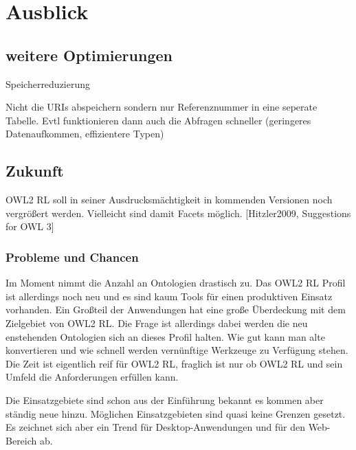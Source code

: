 \chapter{Ausblick}
\label{kapitel-ausblick}

\section{weitere Optimierungen}
Speicherreduzierung

Nicht die URIs abspeichern sondern nur Referenznummer in eine seperate Tabelle. Evtl funktionieren dann auch die Abfragen schneller (geringeres Datenaufkommen, effizientere Typen)

\section{Zukunft}
OWL2 RL soll in seiner Ausdrucksmächtigkeit in kommenden Versionen noch vergrößert werden. Vielleicht sind damit Facets möglich. [Hitzler2009, Suggestions for OWL 3]

\subsection{Probleme und Chancen}
Im Moment nimmt die Anzahl an Ontologien drastisch zu. Das OWL2 RL Profil ist allerdings noch neu und es sind kaum Tools für einen produktiven Einsatz vorhanden. Ein Großteil der Anwendungen hat eine große Überdeckung mit dem Zielgebiet von OWL2 RL. Die Frage ist allerdings dabei werden die neu enstehenden Ontologien sich an dieses Profil halten. Wie gut kann man alte konvertieren und wie schnell werden vernünftige Werkzeuge zu Verfügung stehen. Die Zeit ist eigentlich reif für OWL2 RL, fraglich ist nur ob OWL2 RL und sein Umfeld die Anforderungen erfüllen kann.

Die Einsatzgebiete sind schon aus der Einführung bekannt es kommen aber ständig neue hinzu. Möglichen Einsatzgebieten sind quasi keine Grenzen gesetzt. Es zeichnet sich aber ein Trend für Desktop-Anwendungen und für den Web-Bereich ab.